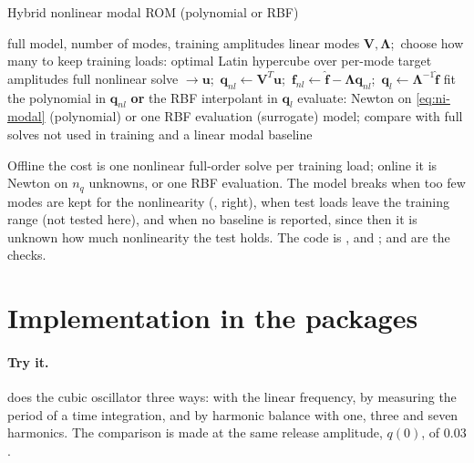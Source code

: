 
\begin{algbox}{Hybrid nonlinear modal ROM (polynomial or RBF)}
\begin{pseudo}
\Require full model, number of modes, training amplitudes
\State linear modes $\bm V,\bm\Lambda$;\ choose how many to keep
\State training loads: optimal Latin hypercube over per-mode target amplitudes
  \State full nonlinear solve $\to\bm u$;\ $\bm q_{nl}\gets\bm V^T\bm u$;\ $\bm f_{nl}\gets\hat{\bm f}-\bm\Lambda\bm q_{nl}$;\ $\bm q_l\gets\bm\Lambda^{-1}\hat{\bm f}$
\EndFor
\State fit the polynomial in $\bm q_{nl}$ \textbf{or} the RBF interpolant in $\bm q_l$
\State evaluate: Newton on \eqref{eq:ni-modal} (polynomial) or one RBF evaluation (surrogate)
\Ensure model; compare with full solves not used in training and a linear modal baseline
\end{pseudo}
\end{algbox}

Offline the cost is one nonlinear full-order solve per training load; online it is Newton on $n_q$ unknowns, or one RBF evaluation. The model breaks when too few modes are kept for the nonlinearity (, right), when test loads leave the training range (not tested here), and when no baseline is reported, since then it is unknown how much nonlinearity the test holds. The code is ,  and ;  and  are the checks.


\section{Implementation in the packages}\label{sec:ni-impl}

\paragraph{Try it.}  does the cubic oscillator three ways: with the linear frequency, by measuring the period of a time integration, and by harmonic balance with one, three and seven harmonics. The comparison is made at the same release amplitude, $q(0)$, of $0.03$.

